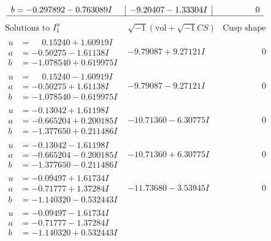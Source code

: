 \documentclass[1p]{elsarticle_modified}
\theoremstyle{definition}
\newcommand{\I}{\sqrt{-1}}
\begin{document}
$$\begin{array}{c|c|c}
\begin{aligned}
b &= -0.297892 - 0.763089 I\end{aligned}
 & -9.20407 - 1.33304 I & \phantom{-0.000000 } 0\\
 \hline 
 \end{array}$$\newpage$$\begin{array}{c|c|c}  
\text{Solutions to }I^u_{1}& \I (\text{vol} + \sqrt{-1}CS) & \text{Cusp shape}\\
 \hline 
\begin{aligned}
u &= \phantom{-}0.15240 + 1.60919 I \\
a &= -0.50275 - 1.61138 I \\
b &= -1.078540 + 0.619975 I\end{aligned}
 & -9.79087 + 9.27121 I & \phantom{-0.000000 } 0 \\ \hline\begin{aligned}
u &= \phantom{-}0.15240 - 1.60919 I \\
a &= -0.50275 + 1.61138 I \\
b &= -1.078540 - 0.619975 I\end{aligned}
 & -9.79087 - 9.27121 I & \phantom{-0.000000 } 0 \\ \hline\begin{aligned}
u &= -0.13042 + 1.61198 I \\
a &= -0.665204 + 0.200185 I \\
b &= -1.377650 + 0.211486 I\end{aligned}
 & -10.71360 - 6.30775 I & \phantom{-0.000000 } 0 \\ \hline\begin{aligned}
u &= -0.13042 - 1.61198 I \\
a &= -0.665204 - 0.200185 I \\
b &= -1.377650 - 0.211486 I\end{aligned}
 & -10.71360 + 6.30775 I & \phantom{-0.000000 } 0 \\ \hline\begin{aligned}
u &= -0.09497 + 1.61734 I \\
a &= -0.71777 + 1.37284 I \\
b &= -1.140320 - 0.532443 I\end{aligned}
 & -11.73680 - 3.53945 I & \phantom{-0.000000 } 0 \\ \hline\begin{aligned}
u &= -0.09497 - 1.61734 I \\
a &= -0.71777 - 1.37284 I \\
b &= -1.140320 + 0.532443 I\end{aligned}

\end{array}$$
\end{document}

